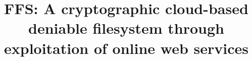 \title{FFS: A cryptographic cloud-based deniable filesystem through exploitation of online web services}